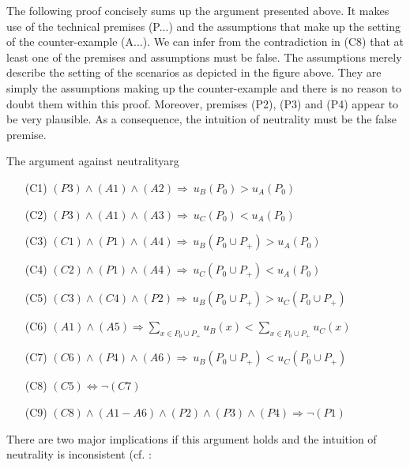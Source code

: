 The following proof concisely sums up the argument presented above. It makes use of the technical premises (P...) and the assumptions that make up the setting of the counter-example (A...). We can infer from the contradiction in (C8) that at least one of the premises and assumptions must be false. The assumptions merely describe the setting of the scenarios as depicted in the figure above. They are simply the assumptions making up the counter-example and there is no reason to doubt them within this proof. Moreover, premises (P2), (P3) and (P4) appear to be very plausible. As a consequence, the intuition of neutrality must be the false premise. 

\begin{Proof}{The argument against neutrality}{arg}
\begin{enumerate}
\item[(C1)] \hspace{1cm}
$(P3) \wedge (A1) \wedge (A2) \Rightarrow \ u_B(P_0) > u_A(P_0)$
\item[(C2)] \hspace{1cm}
$(P3) \wedge (A1) \wedge (A3) \Rightarrow \ u_C(P_0) < u_A(P_0)$
\item[(C3)] \hspace{1cm}
$(C1) \wedge (P1) \wedge (A4) \Rightarrow \ u_B(P_0 \cup P_+) > u_A(P_0)$
\item[(C4)] \hspace{1cm}
$(C2) \wedge (P1) \wedge (A4) \Rightarrow \ u_C(P_0 \cup P_+) < u_A(P_0)$
\item[(C5)] \hspace{1cm}
$(C3) \wedge (C4) \wedge (P2) \Rightarrow \ u_B(P_0 \cup P_+) > u_C(P_0 \cup P_+)$
\item[(C6)] \hspace{1cm}
$(A1) \wedge (A5) \Rightarrow \sum_{x\in P_0 \cup P_+} u_B(x) < \sum_{x \in P_0 \cup P_+} u_C(x)$
\item[(C7)] \hspace{1cm}
$(C6) \wedge (P4) \wedge (A6) \Rightarrow  \ u_B(P_0 \cup P_+) < u_C(P_0 \cup P_+)$
\item[(C8)] \hspace{1cm}
$(C5) \Leftrightarrow \neg (C7)$
\item[(C9)] \hspace{1cm}
$(C8) \wedge (A1-A6) \wedge (P2) \wedge (P3) \wedge (P4) \Rightarrow \neg (P1)$
\end{enumerate}
\end{Proof}

There are two major implications if this argument holds and the intuition of neutrality is inconsistent (cf. : 

